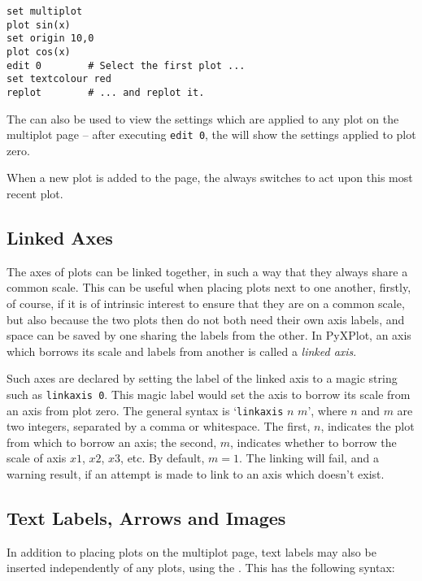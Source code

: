 \begin{verbatim} 
set multiplot
plot sin(x)
set origin 10,0
plot cos(x)
edit 0        # Select the first plot ...
set textcolour red
replot        # ... and replot it.
\end{verbatim}

The  can also be used to view the settings which are applied to
any plot on the multiplot page -- after executing {\tt edit~0}, the
 will show the settings applied to plot zero.

When a new plot is added to the page, the  always switches to
act upon this most recent plot.

\subsection{Linked Axes}

The axes of plots can be linked together, in such a way that they always share
a common scale. This can be useful when placing plots next to one another,
firstly, of course, if it is of intrinsic interest to ensure that they are on a
common scale, but also because the two plots then do not both need their own
axis labels, and space can be saved by one sharing the labels from the other.
In PyXPlot, an axis which borrows its scale and labels from another is called a
{\it linked axis}.

Such axes are declared by setting the label of the linked axis to a magic
string such as {\tt linkaxis 0}\label{linked_axes}. This magic label would set the axis to borrow
its scale from an axis from plot zero. The general syntax is `{\tt linkaxis}
$n$ $m$', where $n$ and $m$ are two integers, separated by a comma or
whitespace. The first, $n$, indicates the plot from which to borrow an axis;
the second, $m$, indicates whether to borrow the scale of axis $x1$, $x2$,
$x3$, etc. By default, $m=1$. The linking will fail, and a warning result, if
an attempt is made to link to an axis which doesn't exist.

\subsection{Text Labels, Arrows and Images}

\label{text_command} In addition to placing plots on the multiplot page, text
labels may also be inserted independently of any plots, using the
. This has the following syntax:

